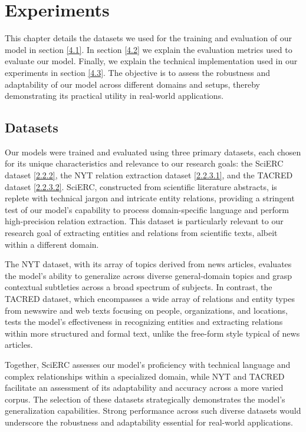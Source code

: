 \chapter{Experiments}
\label{chp:experiments}
This chapter details the datasets we used for the training and evaluation of our model in section \hyperref[sec:experimentsdatasets]{[4.1]}. In section \hyperref[sec:evaluationmetrics]{[4.2]} we explain the evaluation metrics used to evaluate our model. Finally, we explain the technical implementation used in our experiments in section \hyperref[sec:implementation]{[4.3]}. The objective is to assess the robustness and adaptability of our model across different domains and setups, thereby demonstrating its practical utility in real-world applications.

\section{Datasets}
\label{sec:experimentsdatasets}
Our models were trained and evaluated using three primary datasets, each chosen for its unique characteristics and relevance to our research goals: the SciERC dataset \hyperref[sec:sciercdataset]{[2.2.2]}, the NYT relation extraction dataset \hyperref[sec:nytdataset]{[2.2.3.1]}, and the TACRED dataset \hyperref[sec:tacreddataset]{[2.2.3.2]}. SciERC, constructed from scientific literature abstracts, is replete with technical jargon and intricate entity relations, providing a stringent test of our model's capability to process domain-specific language and perform high-precision relation extraction. This dataset is particularly relevant to our research goal of extracting entities and relations from scientific texts, albeit within a different domain.

The NYT dataset, with its array of topics derived from news articles, evaluates the model's ability to generalize across diverse general-domain topics and grasp contextual subtleties across a broad spectrum of subjects. In contrast, the TACRED dataset, which encompasses a wide array of relations and entity types from newswire and web texts focusing on people, organizations, and locations, tests the model’s effectiveness in recognizing entities and extracting relations within more structured and formal text, unlike the free-form style typical of news articles.

Together, SciERC assesses our model's proficiency with technical language and complex relationships within a specialized domain, while NYT and TACRED facilitate an assessment of its adaptability and accuracy across a more varied corpus. The selection of these datasets strategically demonstrates the model's generalization capabilities. Strong performance across such diverse datasets would underscore the robustness and adaptability essential for real-world applications.

